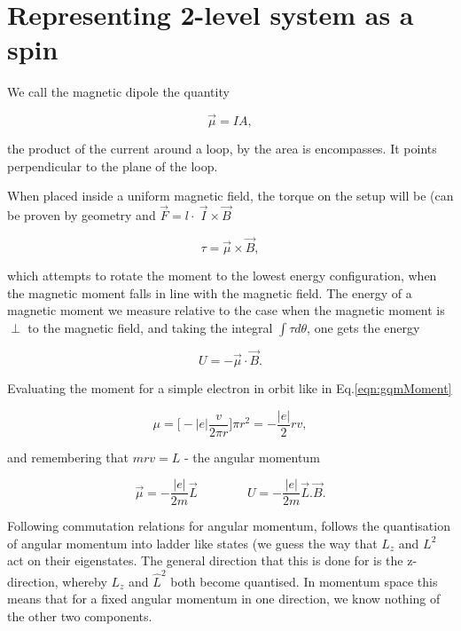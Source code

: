 \section{Representing 2-level system as a spin}
\label{spin12}
  We call the magnetic dipole the quantity
  
  \begin{equation}
  \label{eqn:gqmMoment}
  \vec{\mu} = IA,
  \end{equation}
  
  \noindent the product of the current around a loop, by the area is encompasses. It points perpendicular to the plane of the loop.
  
  When placed inside a uniform magnetic field, the torque on the setup will be (can be proven by geometry and $\vec{F} = l\cdot\ \vec{I}\times \vec{B}$
  
  \begin{equation}
  \tau = \vec{\mu}\times\vec{B},
  \end{equation}
  
  \noindent which attempts to rotate the moment to the lowest energy configuration, when the magnetic moment falls in line with the magnetic field. The energy of a magnetic moment we measure relative to the case when the magnetic moment is $\perp$ to the magnetic field, and taking the integral $\int\tau d\theta$, one gets the energy
  
  \begin{equation}
  U = -\vec{\mu} \cdot \vec{B}.
  \end{equation}
  
  \noindent Evaluating the moment for a simple electron in orbit like in Eq.\ref{eqn:gqmMoment}
  
  \begin{equation}
  \mu = \big[-|e|\frac{v}{2\pi r}\big]\pi r^2 = -\frac{|e|}{2}rv,
  \end{equation}
  
  \noindent and remembering that $mrv = L$ - the angular momentum
  
  \begin{equation}
  \vec{\mu}= -\frac{|e|}{2m}\vec{L} \qquad \qquad U = -\frac{|e|}{2m}\vec{L}.\vec{B}.
  \end{equation}
  
  \noindent Following commutation relations for angular momentum, follows the quantisation of angular momentum into ladder like states (we guess the way that $L_z$ and $L^2$ act on their eigenstates. The general direction that this is done for is the z-direction, whereby $L_z$ and $\hat{L}^2$ both become quantised. In momentum space this means that for a fixed angular momentum in one direction, we know nothing of the other two components.
  
